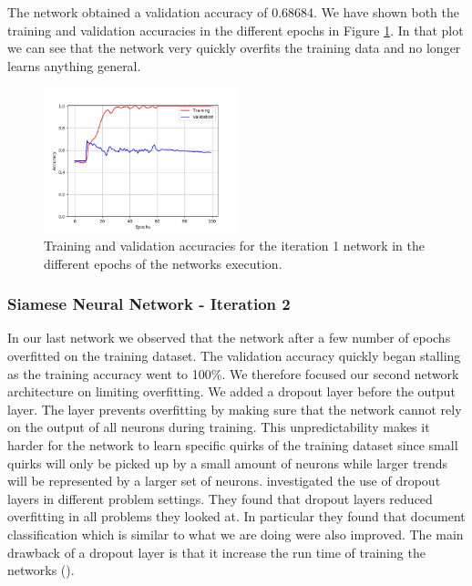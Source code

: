 The network obtained a validation accuracy of 0.68684. We have shown both the
training and validation accuracies in the different epochs in Figure
\ref{fig:network1_accuracies}. In that plot we can see that the network very
quickly overfits the training data and no longer learns anything general.

\begin{figure}[htb]
    \centering
    \includegraphics[width=0.5\textwidth]{./pictures/experiments/network_1_accuracies.png}
    \caption{Training and validation accuracies for the iteration 1 network in
        the different epochs of the networks execution.}
    \label{fig:network1_accuracies}
\end{figure}


\subsubsection{Siamese Neural Network - Iteration 2}


In our last network we observed that the network after a few number of epochs
overfitted on the training dataset. The validation accuracy quickly began
stalling as the training accuracy went to 100\%. We therefore focused our
second network architecture on limiting overfitting. We added a dropout layer
before the output layer. The layer prevents overfitting by making sure that
the network cannot rely on the output of all neurons during training. This
unpredictability makes it harder for the network to learn specific quirks of
the training dataset since small quirks will only be picked up by a small
amount of neurons while larger trends will be represented by a larger set
of neurons. \cite{JMLR:v15:srivastava14a} investigated the use of dropout
layers in different problem settings. They found that dropout layers reduced
overfitting in all problems they looked at. In particular they found that
document classification which is similar to what we are doing were also
improved. The main drawback of a dropout layer is that it increase the run time
of training the networks (\cite{JMLR:v15:srivastava14a}).

